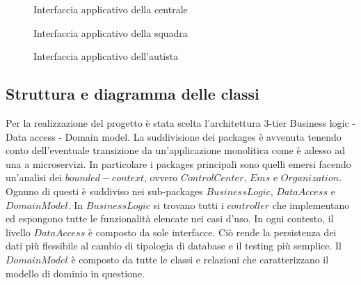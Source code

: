 \documentclass{article}
\begin{document}
    \begin{figure}
        \centering
        
        \caption{Interfaccia applicativo della centrale}
        \label{fig:mockup-controlcenter}
    \end{figure}
    \begin{figure}
        \centering
        
        \caption{Interfaccia applicativo della squadra}
        \label{fig:mockup-soccorritore}
    \end{figure}
    \begin{figure}
        \centering
        
        \caption{Interfaccia applicativo dell'autista}
        \label{fig:mockup-autista}
    \end{figure}
    \subsection{Struttura e diagramma delle classi}
    Per la realizzazione del progetto è stata scelta l'architettura 3-tier Business logic - Data access - Domain model.
    La suddivisione dei packages è avvenuta tenendo conto dell'eventuale transizione da un'applicazione monolitica come è adesso ad una a microservizi.
    In particolare i packages principali sono quelli emersi facendo un'analisi dei $bounded-context$, ovvero $ControlCenter$, $Ems$ e $Organization$.
    Ognuno di questi è suddiviso nei sub-packages $BusinessLogic$, $DataAccess$ e $DomainModel$.
    \newline In $BusinessLogic$ si trovano tutti i $controller$ che implementano ed espongono tutte le funzionalità elencate nei casi d'uso.
    \newline In ogni contesto, il livello $DataAccess$ è composto da sole interfacce. Ciò rende la persistenza dei dati più flessibile al cambio di tipologia di database e il testing più semplice.
    \newline Il $DomainModel$ è composto da tutte le classi e relazioni che caratterizzano il modello di dominio in questione.
\end{document}
